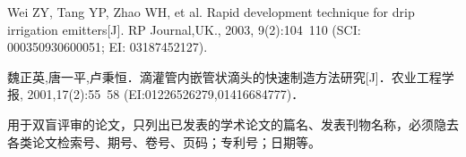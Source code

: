 \begin{achievelist}
    \item Wei ZY, Tang YP, Zhao WH, et al. Rapid development technique for drip irrigation emitters[J]. RP Journal,UK., 2003, 9(2):104~110 (SCI: 000350930600051; EI: 03187452127).
    \item 魏正英,唐一平,卢秉恒．滴灌管内嵌管状滴头的快速制造方法研究[J]．农业工程学报, 2001,17(2):55~58 (EI:01226526279,01416684777)．
    \item 
    \item 
    \item 
    \item 
    \item 
    \item 
    \item 
    \item 
    \item 
    \item 
    \item 
    \item 
    \item 
    \item 
    \item 
    \item 
    \item 
    \item 
    \item 
    \item 
    \item 
    \item 
    \item 
    
\end{achievelist}

\vspace{\baselineskip}
{\color{red} 用于双盲评审的论文，只列出已发表的学术论文的篇名、发表刊物名称，必须隐去各类论文检索号、期号、卷号、页码；专利号；日期等。}